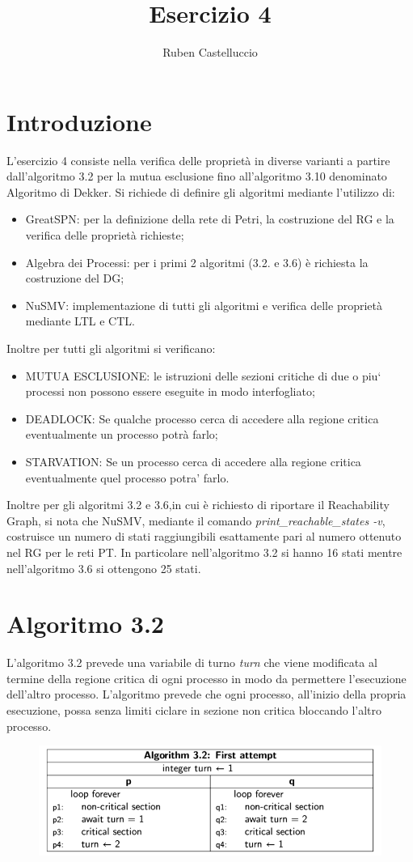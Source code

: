 \documentclass{article}
\title{Esercizio 4}
\author{Ruben Castelluccio}
\begin{document}
\maketitle

\section{Introduzione}
L'esercizio 4 consiste nella verifica delle proprietà in diverse varianti a partire dall'algoritmo 3.2 per la mutua esclusione fino all'algoritmo 3.10 denominato Algoritmo di Dekker. Si richiede di definire gli algoritmi mediante l'utilizzo di:
\begin{itemize}
    \item GreatSPN: per la definizione della rete di Petri, la costruzione del RG e la verifica delle proprietà richieste;
    \item Algebra dei Processi: per i primi 2 algoritmi (3.2. e 3.6) è richiesta la costruzione del DG;
    \item NuSMV: implementazione di tutti gli algoritmi e verifica delle proprietà mediante LTL e CTL.
\end{itemize}
Inoltre per tutti gli algoritmi si verificano:
\begin{itemize}
    \item MUTUA ESCLUSIONE: le istruzioni delle sezioni critiche di due o piu` processi non possono essere eseguite in modo interfogliato;
    \item DEADLOCK: Se qualche processo cerca di accedere alla regione critica eventualmente un processo potrà farlo;
    \item STARVATION: Se un processo cerca di accedere alla regione critica eventualmente quel processo potra’ farlo.
\end{itemize}
Inoltre per gli algoritmi 3.2 e 3.6,in cui è richiesto di riportare il Reachability Graph, si nota che NuSMV, mediante il comando \textit{print\_reachable\_states -v}, costruisce un numero di stati raggiungibili esattamente pari al numero ottenuto nel RG per le reti PT. In particolare nell'algoritmo 3.2 si hanno 16 stati mentre nell'algoritmo 3.6  si ottengono 25 stati.
\clearpage
\section{Algoritmo 3.2}
L'algoritmo 3.2 prevede una variabile di turno \textit{turn} che viene modificata al termine della regione critica di ogni processo in modo da permettere l'esecuzione dell'altro processo. L'algoritmo prevede che ogni processo, all'inizio della propria esecuzione, possa senza limiti ciclare in sezione non critica bloccando l'altro processo. 
\begin{figure}[h] 
\centering
\includegraphics[scale=0.6]{3.2.png}
\end{figure}
\clearpage
\end{document}
